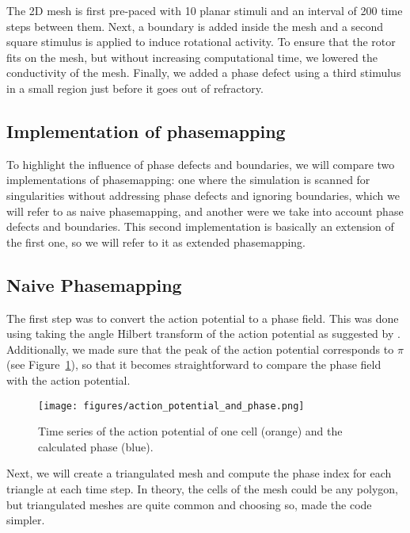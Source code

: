 \documentclass[twocolumn]{article}
\begin{document}
The 2D mesh is first pre-paced with 10 planar stimuli and an interval of
200 time steps between them. Next, a boundary is added inside the mesh
and a second square stimulus is applied to induce rotational activity.
To ensure that the rotor fits on the mesh, but without increasing
computational time, we lowered the conductivity of the mesh. Finally, we
added a phase defect using a third stimulus in a small region just
before it goes out of refractory.

\subsection{Implementation of
phasemapping}\label{implementation-of-phasemapping}

To highlight the influence of phase defects and boundaries, we will
compare two implementations of phasemapping: one where the simulation is
scanned for singularities without addressing phase defects and ignoring
boundaries, which we will refer to as naive phasemapping, and another
were we take into account phase defects and boundaries. This second
implementation is basically an extension of the first one, so we will
refer to it as extended phasemapping.

\subsection{Naive Phasemapping}\label{naive-phasemapping}

The first step was to convert the action potential to a phase field.
This was done using taking the angle Hilbert transform of the action
potential as suggested by \autocite{bray2002considerations}. Additionally,
we made sure that the peak of the action potential corresponds to
\(\pi\) (see Figure~\ref{fig:action_potential_and_phase}),
so that it becomes straightforward to compare the phase field with
the action potential.

\begin{figure}[ht]
  \begin{center}
    \texttt{[image: figures/action\_potential\_and\_phase.png]}
  \end{center}
  \caption{
    Time series of the action potential of one cell (orange)
    and the calculated phase (blue).
  }\label{fig:action_potential_and_phase}
\end{figure}

Next, we will create a triangulated mesh and compute the phase index for
each triangle at each time step. In theory, the cells of the mesh could
be any polygon, but triangulated meshes are quite common and choosing
so, made the code simpler.
\end{document}
